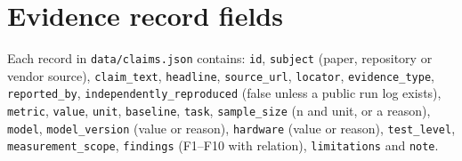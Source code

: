 \section{Evidence record fields}\label{sec:appendix-b-evidence-record-fields}

Each record in \texttt{data/claims.json} contains: \texttt{id}, \texttt{subject} (paper, repository or vendor source), \texttt{claim\_text}, \texttt{headline}, \texttt{source\_url}, \texttt{locator}, \texttt{evidence\_type}, \texttt{reported\_by}, \texttt{independently\_reproduced} (false unless a public run log exists), \texttt{metric}, \texttt{value}, \texttt{unit}, \texttt{baseline}, \texttt{task}, \texttt{sample\_size} (n and unit, or a reason), \texttt{model}, \texttt{model\_version} (value or reason), \texttt{hardware} (value or reason), \texttt{test\_level}, \texttt{measurement\_scope}, \texttt{findings} (F1–F10 with relation), \texttt{limitations} and \texttt{note}.
